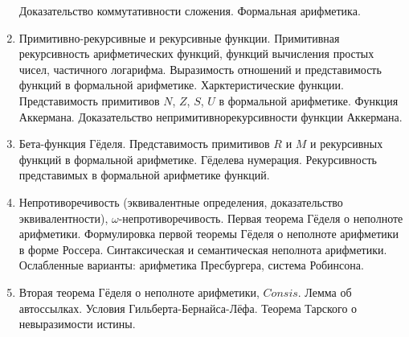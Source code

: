 \documentclass[11pt,a4paper,oneside]{scrartcl}
\begin{document}
\begin{enumerate}
Доказательство коммутативности сложения. Формальная арифметика. 
\item Примитивно-рекурсивные и рекурсивные функции. Примитивная рекурсивность 
арифметических функций, функций вычисления простых чисел, частичного логарифма.
Выразимость отношений и представимость функций в формальной арифметике. Харктеристические функции.
Представимость примитивов $N$, $Z$, $S$, $U$ в формальной арифметике.
Функция Аккермана. Доказательство непримитивнорекурсивности функции Аккермана.
\item Бета-функция Гёделя. Представимость примитивов $R$ и $M$ и рекурсивных функций в формальной арифметике.
Гёделева нумерация. Рекурсивность представимых в формальной арифметике функций.
\item Непротиворечивость (эквивалентные определения, доказательство эквивалентности), $\omega$-не\-про\-ти\-во\-речивость. 
Первая теорема Гёделя о неполноте арифметики.
Формулировка первой теоремы Гёделя о неполноте арифметики в форме Россера. Синтаксическая и семантическая неполнота арифметики.
Ослабленные варианты: арифметика Пресбургера, система Робинсона.
\item Вторая теорема Гёделя о неполноте арифметики, $Consis$. 
Лемма об автоссылках. Условия Гильберта-Бернайса-Лёфа. Теорема Тарского о невыразимости истины.
\end{enumerate}
\end{document}
